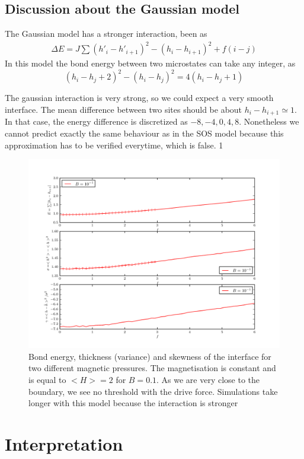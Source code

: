	\subsection{Discussion about the Gaussian model}
	
The Gaussian model has a stronger interaction, been as
\begin{align}
	\Delta E = J \sum (h'_i-h'_{i+1})^2 -(h_i-h_{i+1})^2+ f (i-j)
\end{align}
In this model the bond energy between two microstates can take any integer, as 
\begin{equation*}
	(h_i-h_j+2)^2 - (h_i-h_j)^2 = 4 (h_i-h_j+1)
\end{equation*}

The gaussian interaction is very strong, so we could expect a very smooth interface. The mean difference between two sites should be about $h_i-h_{i+1} \simeq 1$. In that case, the energy difference is discretized as ${-8,-4,0,4,8}$. 
Nonetheless we cannot predict exactly the same behaviour as in the SOS model because this approximation has to be verified everytime, which is false. 1

\begin{figure}
	\includegraphics[width=\linewidth]{./semiifgeom/gauss0.pdf}
	\caption{Bond energy, thickness (variance) and skewness of the interface for two different magnetic pressures. The magnetisation is constant and is equal to $<H>=2$ for $B=0.1$. As we are very close to the boundary, we see no threshold with the drive force. Simulations take longer with this model because the interaction is stronger}
\end{figure}

	\section{Interpretation}
	
	